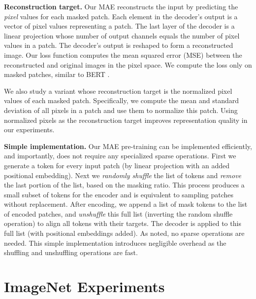 \textbf{Reconstruction target.} Our MAE reconstructs the input by predicting the \textit{pixel} values for each masked patch. Each element in the decoder's output is a vector of pixel values representing a patch. The last layer of the decoder is a linear projection whose number of output channels equals the number of pixel values in a patch. The decoder's output is reshaped to form a reconstructed image. Our loss function computes the mean squared error (MSE) between the reconstructed and original images in the pixel space. We compute the loss only on \mbox{masked} patches, similar to BERT \cite{Devlin2019}.\footnotemark


We also study a variant whose reconstruction target is the normalized pixel values of each masked patch. Specifically, we compute the mean and standard deviation of all pixels in a patch and use them to normalize this patch. Using normalized pixels as the reconstruction target improves representation quality in our experiments.

\textbf{Simple implementation.} Our MAE pre-training can be implemented efficiently, and importantly, does not require any specialized sparse operations. First we generate a token for every input patch (by linear projection with an added positional embedding). Next we \emph{randomly shuffle} the list of tokens and \emph{remove} the last portion of the list, based on the masking ratio. This process produces a small subset of tokens for the encoder and is equivalent to sampling patches without replacement. After encoding, we append a list of mask tokens to the list of encoded patches, and \emph{unshuffle} this full list (inverting the random shuffle operation) to align all tokens with their targets. The decoder is applied to this full list (with positional embeddings added). As noted, no sparse operations are needed. This simple implementation introduces negligible overhead as the shuffling and unshuffling operations are fast.

\section{ImageNet Experiments}
\label{sec:exp}

